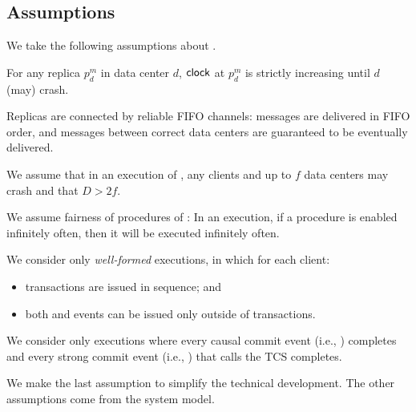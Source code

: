 
\subsection{Assumptions} \label{ss:assumptions}

We take the following assumptions about \unistore.

\begin{appassumption} \label{assumption:clock}
  For any replica $p^{m}_{d}$ in data center $d$,
  ${\sf clock}$ at $p^{m}_{d}$ is strictly increasing until $d$ (may) crash.
\end{appassumption}

\begin{appassumption} \label{assumption:message}
  Replicas are connected by reliable FIFO channels:
  messages are delivered in FIFO order,
  and messages between correct data centers
  are guaranteed to be eventually delivered.
\end{appassumption}

\begin{appassumption} \label{assumption:failure-model}
  We assume that in an execution of \unistore, any clients
  and up to $f$ data centers may crash and that $D > 2f$.
\end{appassumption}

\begin{appassumption} \label{assumption:fairness}
  We assume fairness of procedures of \unistore:
  In an execution, if a procedure is enabled infinitely often,
  then it will be executed infinitely often.
\end{appassumption}

\begin{appassumption} \label{assumption:client-well-formed}
  We consider only \emph{well-formed} executions,
  in which for each client:
  \begin{itemize}
    \item transactions are issued in sequence; and
    \item both \fence{} and \clattach{} events
      can be issued only outside of transactions.
  \end{itemize}
\end{appassumption}

\begin{appassumption} \label{assumption:complete-execution}
  We consider only executions where
  every causal commit event (i.e., \commitcausaltx) completes
  and every strong commit event (i.e., \commitstrongtx) that calls the TCS completes.
\end{appassumption}

We make the last assumption to simplify the technical development. The other
assumptions come from the system model.
